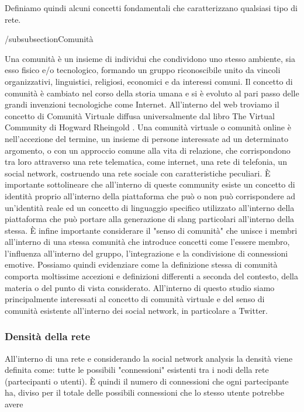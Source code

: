 \documentclass[11pt]{article}
\begin{document}
Definiamo quindi alcuni concetti fondamentali che caratterizzano qualsiasi tipo di rete.

/subsubsection{Comunità}

Una comunità è un insieme di individui che condividono uno stesso ambiente, sia esso fisico e/o tecnologico, formando un gruppo riconoscibile unito da vincoli organizzativi, linguistici, religiosi, economici e da interessi comuni. \cite{Comunita}
Il concetto di comunità è cambiato nel corso della storia umana e si è evoluto al pari passo delle grandi invenzioni tecnologiche come Internet.
All'interno del web troviamo il concetto di Comunità Virtuale \cite{ComunitaVirtuale} diffusa universalmente dal libro The Virtual Community di Hogward Rheingold \cite{VirtualCommunity}. Una comunità virtuale o comunità online è nell'accezione del termine, un insieme di persone interessate ad un determinato argomento, o con un approccio comune alla vita di relazione, che corrispondono tra loro attraverso una rete telematica, come internet, una rete di telefonia, un social network, costruendo una rete sociale con caratteristiche peculiari. È importante sottolineare che all'interno di queste community esiste un concetto di identità proprio all'interno della piattaforma che può o non può corrispondere ad un'identità reale ed un concetto di linguaggio specifico utilizzato all'interno della piattaforma che può portare alla generazione di slang particolari all'interno della stessa.
È infine importante considerare il "senso di comunità" \cite{ComunitaSenso} che unisce i membri all'interno di una stessa comunità che introduce concetti come l'essere membro, l'influenza all'interno del gruppo, l'integrazione e la condivisione di connessioni emotive.
Possiamo quindi evidenziare come la definizione stessa di comunità comporta moltissime accezioni e definizioni differenti a seconda del contesto, della materia o del punto di vista considerato.
All'interno di questo studio siamo principalmente interessati al concetto di comunità virtuale e del senso di comunità esistente all'interno dei social network, in particolare a Twitter.

\subsubsection{Densità della rete}
All'interno di una rete e considerando la social network analysis la densità viene definita come: tutte le possibili "connessioni" esistenti tra i nodi della rete (partecipanti o utenti). È quindi il numero di connessioni che ogni partecipante ha, diviso per il totale delle possibili connessioni che lo stesso utente potrebbe avere \cite{PatternNetworkLearning}
\end{document}
